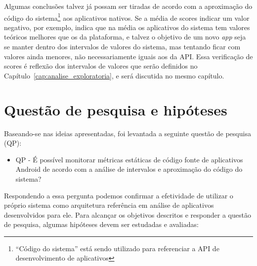 
Algumas conclusões talvez já possam ser tiradas de acordo com a aproximação do código do sistema\footnote{``Código do sistema'' está sendo utilizado para referenciar a API de desenvolvimento de aplicativos} aos aplicativos nativos. Se a média de scores indicar um valor negativo, por exemplo, indica que na média os aplicativos do sistema tem valores teóricos melhores que os da plataforma, e talvez o objetivo de um novo \textit{app} seja se manter dentro dos intervalos de valores do sistema, mas tentando ficar com valores ainda menores, não necessariamente iguais aos da API. Essa verificação de scores é reflexão dos intervalos de valores que serão definidos no Capítulo~\ref{cap:analise_exploratoria}, e será discutida no mesmo capítulo.

\section{Questão de pesquisa e hipóteses}

Baseando-se nas ideias apresentadas, foi levantada a seguinte questão de pesquisa (QP):

\begin{itemize}
\item QP - É possível monitorar métricas estáticas de código fonte de aplicativos Android de acordo com a análise de intervalos e aproximação do código do sistema?
\end{itemize}

Respondendo a essa pergunta podemos confirmar a efetividade de utilizar o próprio sistema como arquitetura referência em análise de aplicativos desenvolvidos para ele. Para alcançar os objetivos descritos e responder a questão de pesquisa, algumas hipóteses devem ser estudadas e avaliadas:

